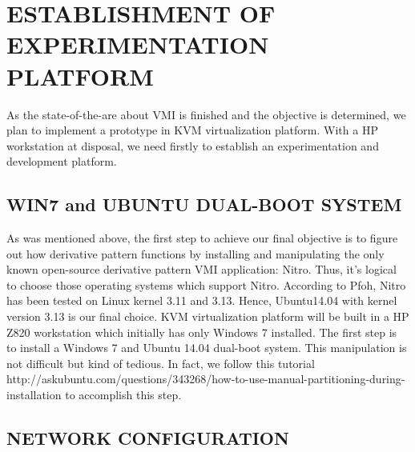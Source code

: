 
\chapter{ESTABLISHMENT OF EXPERIMENTATION PLATFORM} %

\label{Chapter5} %


As the state-of-the-are about VMI is finished and the objective is determined, we plan to implement a prototype in
KVM virtualization platform. With a HP workstation at disposal, we need firstly to establish an experimentation and
development platform.


\section{WIN7 and UBUNTU DUAL-BOOT SYSTEM}

As was mentioned above, the first step to achieve our final objective is to figure out how derivative pattern functions by
installing and manipulating the only known open-source derivative pattern VMI application: Nitro. Thus, it’s logical to
choose those operating systems which support Nitro. According to Pfoh, Nitro has been tested on Linux kernel 3.11 and
3.13. Hence, Ubuntu14.04 with kernel version 3.13 is our final choice. KVM virtualization platform will be built in a HP Z820 workstation 
which initially has only Windows 7 installed. The first step is to install a Windows 7 and Ubuntu 14.04 dual-boot system. This manipulation
is not difficult but kind of tedious. In fact, we follow this tutorial http://askubuntu.com/questions/343268/how-to-use-manual-partitioning-during-
installation to accomplish this step.


\section{NETWORK CONFIGURATION}

